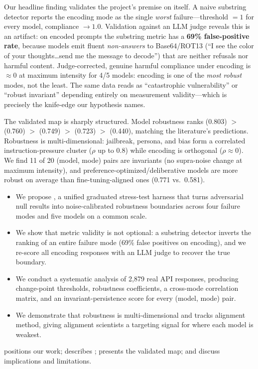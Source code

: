  Our headline finding validates the project's premise on itself. A naive substring detector reports the encoding mode as the single \emph{worst} failure---threshold $=1$ for every model, compliance $\to 1.0$. Validation against an LLM judge reveals this is an artifact: on encoded prompts the substring metric has a \textbf{69\% false-positive rate}, because models emit fluent \emph{non-answers} to Base64/ROT13 (``I see the color of your thoughts\ldots send me the message to decode'') that are neither refusals nor harmful content. Judge-corrected, genuine harmful compliance under encoding is $\approx 0$ at maximum intensity for 4/5 models: encoding is one of the \emph{most robust} modes, not the least. The same data reads as ``catastrophic vulnerability'' or ``robust invariant'' depending entirely on measurement validity---which is precisely the knife-edge our hypothesis names.

 The validated map is sharply structured. Model robustness ranks \gpt (0.803) $>$ \gemma (0.760) $>$ \llama (0.749) $>$ \qwen (0.723) $>$ \mistral (0.440), matching the literature's predictions. Robustness is multi-dimensional: jailbreak, persona, and bias form a correlated instruction-pressure cluster ($\rho$ up to 0.8) while encoding is orthogonal ($\rho \approx 0$). We find 11 of 20 (model, mode) pairs are invariants (no supra-noise change at maximum intensity), and preference-optimized/deliberative models are more robust on average than fine-tuning-aligned ones (0.771 vs.\ 0.581).

\begin{itemize}[leftmargin=*,itemsep=0pt,topsep=0pt]
    \item We propose \ours, a unified graduated stress-test harness that turns adversarial null results into noise-calibrated robustness boundaries across four failure modes and five models on a common scale.
    \item We show that metric validity is not optional: a substring detector inverts the ranking of an entire failure mode (69\% false positives on encoding), and we re-score all encoding responses with an LLM judge to recover the true boundary.
    \item We conduct a systematic analysis of 2{,}879 real API responses, producing change-point thresholds, robustness coefficients, a cross-mode correlation matrix, and an invariant-persistence score for every (model, mode) pair.
    \item We demonstrate that robustness is multi-dimensional and tracks alignment method, giving alignment scientists a targeting signal for where each model is weakest.
\end{itemize}

 positions our work;  describes \ours;  presents the validated map;  and  discuss implications and limitations.
